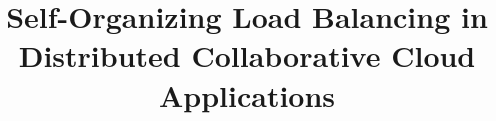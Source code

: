 \documentclass{sig-alternate}
\begin{document}

\title{Self-Organizing Load Balancing in Distributed Collaborative Cloud Applications}

%
%
%
%
%
\end{document}
